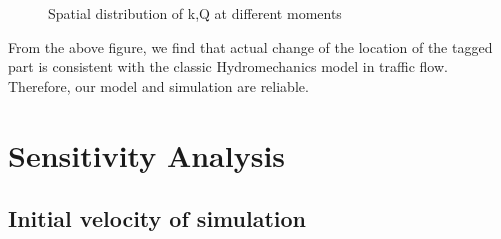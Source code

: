 \documentclass{mcmthesis}
\begin{document}
\begin{figure}[H]
\centering
{}
 \caption{Spatial distribution of k,Q at different moments} \label{fig:1}
\end{figure}
\indent From the above figure, we find that actual change of the location of the tagged part is consistent with the classic Hydromechanics model in traffic flow. \\
\indent Therefore, our model and simulation are reliable.


\section{Sensitivity Analysis}
\subsection{Initial velocity of simulation}
\end{document}
